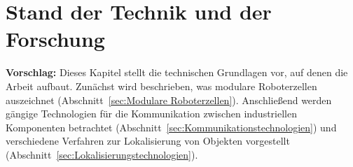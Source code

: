 \cleardoublepage
\chapter{Stand der Technik und der Forschung}
\label{ch:Stand_der_Technik}

\textbf{Vorschlag:} Dieses Kapitel stellt die technischen Grundlagen vor, auf denen die Arbeit aufbaut. Zunächst wird beschrieben, was modulare Roboterzellen auszeichnet (Abschnitt~\ref{sec:Modulare Roboterzellen}). Anschließend werden gängige Technologien für die Kommunikation zwischen industriellen Komponenten betrachtet (Abschnitt~\ref{sec:Kommunikationstechnologien}) und verschiedene Verfahren zur Lokalisierung von Objekten vorgestellt (Abschnitt~\ref{sec:Lokalisierungstechnologien}).

%
%
%
